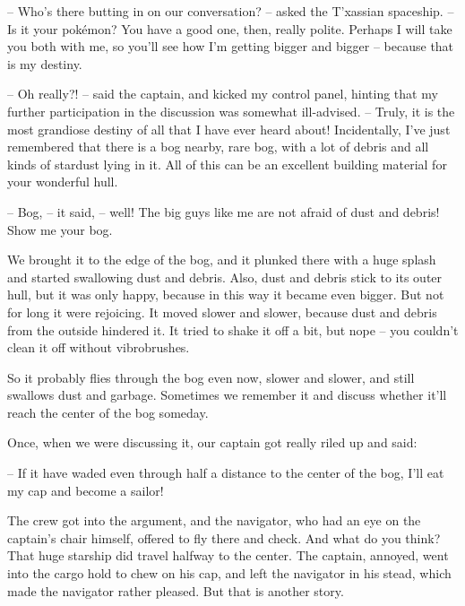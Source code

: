 \documentclass[ebook,oneside,final,openright]{memoir}
\begin{document}
– Who’s there butting in on our conversation? – asked the T’xassian spaceship. – Is it your pokémon? You have a good one, then, really polite. Perhaps I will take you both with me, so you’ll see how I’m getting bigger and bigger – because that is my destiny.\par
– Oh really?! – said the captain, and kicked my control panel, hinting that my further participation in the discussion was somewhat ill-advised. – Truly, it is the most grandiose destiny of all that I have ever heard about! Incidentally, I’ve just remembered that there is a bog nearby, rare bog, with a lot of debris and all kinds of stardust lying in it. All of this can be an excellent building material for your wonderful hull.\par
– Bog, – it said, – well! The big guys like me are not afraid of dust and debris! Show me your bog.\par
\par
We brought it to the edge of the bog, and it plunked there with a huge splash and started swallowing dust and debris. Also, dust and debris stick to its outer hull, but it was only happy, because in this way it became even bigger. But not for long it were rejoicing. It moved slower and slower, because dust and debris from the outside hindered it. It tried to shake it off a bit, but nope – you couldn’t clean it off without vibrobrushes.\par
\par
So it probably flies through the bog even now, slower and slower, and still swallows dust and garbage. Sometimes we remember it and discuss whether it’ll reach the center of the bog someday.\par
\par
Once, when we were discussing it, our captain got really riled up and said:\par
– If it have waded even through half a distance to the center of the bog, I’ll eat my cap and become a sailor!\par
\par
The crew got into the argument, and the navigator, who had an eye on the captain’s chair himself, offered to fly there and check. And what do you think? That huge starship did travel halfway to the center. The captain, annoyed, went into the cargo hold to chew on his cap, and left the navigator in his stead, which made the navigator rather pleased. But that is another story.
\end{document}
